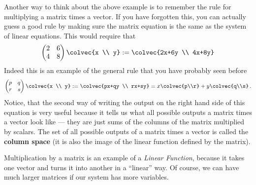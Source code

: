 Another way to think about the above example is to remember the rule for multiplying a matrix times a vector.
\hypertarget{system2matrix}{If} you have forgotten this, you can actually  guess a good rule by making sure the matrix equation is the same as the system of linear equations.
This would require that
\[
 \begin{pmatrix}
      2     & 6 \\
      4     & 8
    \end{pmatrix}
  \colvec{x \\ y}
  :=   \colvec{2x+6y \\ 4x+8y}
\]
Indeed this is an example of
\hypertarget{ch1vecmult}{the general rule} that you have probably seen before
\begin{equation*}\label{2x2multiplication}
    \begin{pmatrix}
      p     & q  \\
      r      & s
    \end{pmatrix}
  \colvec{x \\ y}
  :=
  \colvec{px+qy \\ rx+sy}=x\colvec{p\\r} + y\colvec{q\\s}\, .
\end{equation*}
Notice, that the second way of writing the output on the right hand side of this equation is very useful because it
tells us what all possible outputs a matrix times a vector look like --- they are just sums of the columns of the matrix
multiplied by scalars. The set of all possible outputs of a matrix times a vector is called 
the {\bfseries column space} (it is also the image of the linear function defined by the matrix).


 


\noindent
Multiplication by 
\hypertarget{earlier}{a matrix} is an example of a \emph{Linear Function}, because it takes one vector and turns it into another in a ``linear'' way.
Of course, we can have much larger matrices if our system has more variables.


